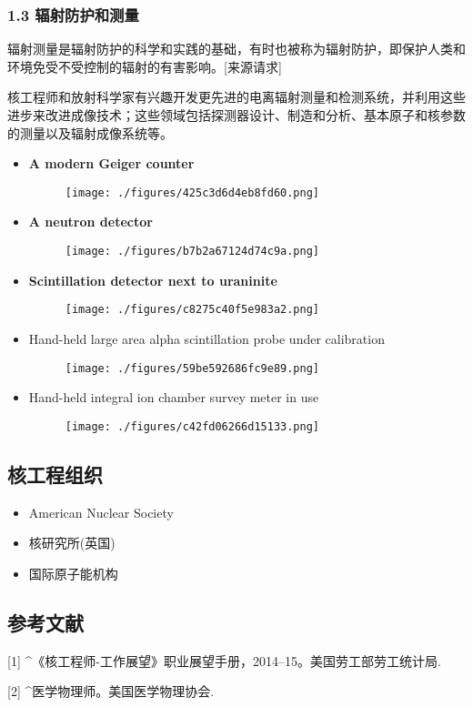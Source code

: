 \subsubsection{1.3 辐射防护和测量}
辐射测量是辐射防护的科学和实践的基础，有时也被称为辐射防护，即保护人类和环境免受不受控制的辐射的有害影响。[来源请求]

核工程师和放射科学家有兴趣开发更先进的电离辐射测量和检测系统，并利用这些进步来改进成像技术；这些领域包括探测器设计、制造和分析、基本原子和核参数的测量以及辐射成像系统等。
\begin{itemize}
\item \textbf{A modern Geiger counter}
\begin{figure}[ht]
\centering
\texttt{[image: ./figures/425c3d6d4eb8fd60.png]}
\caption\label{fig_HGC_10}
\end{figure}
\item \textbf{A neutron detector}
\begin{figure}[ht]
\centering
\texttt{[image: ./figures/b7b2a67124d74c9a.png]}
\caption\label{fig_HGC_11}
\end{figure}
\item \textbf{Scintillation detector next to uraninite}
\begin{figure}[ht]
\centering
\texttt{[image: ./figures/c8275c40f5e983a2.png]}
\caption\label{fig_HGC_14}
\end{figure}
\item Hand-held large area alpha scintillation probe under calibration
\begin{figure}[ht]
\centering
\texttt{[image: ./figures/59be592686fc9e89.png]}
\caption\label{fig_HGC_15}
\end{figure}
\item Hand-held integral ion chamber survey meter in use
\begin{figure}[ht]
\centering
\texttt{[image: ./figures/c42fd06266d15133.png]}
\caption\label{fig_HGC_16}
\end{figure}
\end{itemize}

\subsection{核工程组织}
\begin{itemize}
\item American Nuclear Society
\item 核研究所(英国)
\item 国际原子能机构
\end{itemize}

\subsection{参考文献}
[1]
^《核工程师-工作展望》职业展望手册，2014–15。美国劳工部劳工统计局.

[2]
^医学物理师。美国医学物理协会.